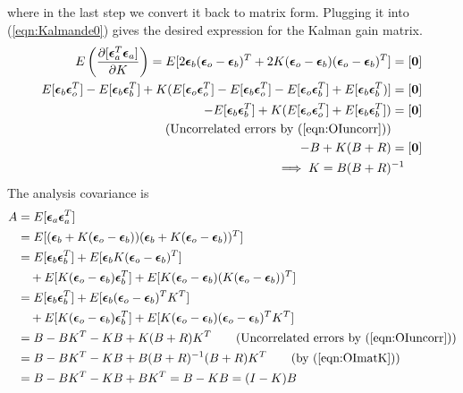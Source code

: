 where in the last step we convert it back to matrix form. Plugging it into (\ref{eqn:Kalmande0}) gives the desired expression for the Kalman gain matrix.
\begin{align}
E\left(\frac{\partial [\bm{\epsilon}_a^T\bm{\epsilon}_a]}{\partial K}\right) = E[2 \bm{\epsilon}_b (\bm{\epsilon}_o - \bm{\epsilon}_b)^T + 2K(\bm{\epsilon}_o - \bm{\epsilon}_b)(\bm{\epsilon}_o - \bm{\epsilon}_b)^T] &= [\textbf{0}] \nonumber \\
E[\bm{\epsilon}_b\bm{\epsilon}_o^T] - E[\bm{\epsilon}_b\bm{\epsilon}_b^T] + K(E[\bm{\epsilon}_o\bm{\epsilon}_o^T] - E[\bm{\epsilon}_b\bm{\epsilon}_o^T] - E[\bm{\epsilon}_o\bm{\epsilon}_b^T] + E[\bm{\epsilon}_b\bm{\epsilon}_b^T)] &= [\textbf{0}] \nonumber \\
- E[\bm{\epsilon}_b\bm{\epsilon}_b^T] + K(E[\bm{\epsilon}_o\bm{\epsilon}_o^T] + E[\bm{\epsilon}_b\bm{\epsilon}_b^T]) &= [\textbf{0}] \nonumber \\
\text{(Uncorrelated errors by (\ref{eqn:OIuncorr}))} & \nonumber \\
- B + K(B+R) &= [\textbf{0}] \nonumber \\
\implies K = B(B+R)&^{-1} \label{eqn:OImatK}
\end{align}
The analysis covariance is
\begin{align}
A &= E[\bm{\epsilon}_a\bm{\epsilon}_a^T] \nonumber \\
&= E[(\bm{\epsilon}_b + K(\bm{\epsilon}_o - \bm{\epsilon}_b))(\bm{\epsilon}_b + K(\bm{\epsilon}_o - \bm{\epsilon}_b))^T] \nonumber \\
&= E[\bm{\epsilon}_b\bm{\epsilon}_b^T] + E[\bm{\epsilon}_bK(\bm{\epsilon}_o - \bm{\epsilon}_b)^T] \nonumber \\
&\quad + E[K(\bm{\epsilon}_o - \bm{\epsilon}_b)\bm{\epsilon}_b^T] + E[K(\bm{\epsilon}_o - \bm{\epsilon}_b)(K(\bm{\epsilon}_o - \bm{\epsilon}_b))^T] \nonumber \\
&= E[\bm{\epsilon}_b\bm{\epsilon}_b^T] + E[\bm{\epsilon}_b(\bm{\epsilon}_o - \bm{\epsilon}_b)^TK^T] \nonumber \\
&\quad + E[K(\bm{\epsilon}_o - \bm{\epsilon}_b)\bm{\epsilon}_b^T] + E[K(\bm{\epsilon}_o - \bm{\epsilon}_b) (\bm{\epsilon}_o - \bm{\epsilon}_b)^TK^T] \nonumber \\
&= B - BK^T - KB + K(B+R)K^T \qquad \text{(Uncorrelated errors by (\ref{eqn:OIuncorr}))} \nonumber \\
&= B - BK^T - KB + B(B+R)^{-1} (B+R)K^T \qquad \text{(by (\ref{eqn:OImatK}))} \nonumber \\
&= B - BK^T - KB + BK^T = B - KB = (I-K)B \label{eqn:OIAnalysis}
\end{align}
